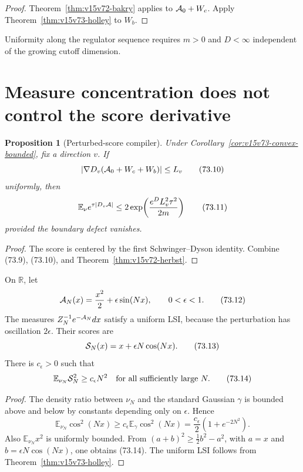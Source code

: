 \documentclass[11pt]{article}
\newtheorem{proposition}[theorem]{Proposition}
\theoremstyle{remark}
\begin{document}
\begin{proof}
Theorem~\ref{thm:v15v72-bakry} applies to
\({\cal A}_0+W_c\).  Apply
Theorem~\ref{thm:v15v73-holley} to \(W_b\).
\end{proof}

Uniformity along the regulator sequence requires \(m>0\) and
\(D<\infty\) independent of the growing cutoff dimension.

\section{Measure concentration does not control the score derivative}

\begin{proposition}[Perturbed-score compiler]
\label{prop:v15v73-score}
Under Corollary~\ref{cor:v15v73-convex-bounded}, fix a direction
\(v\).  If
\[
 \left|
 \nabla D_v({\cal A}_0+W_c+W_b)
 \right|\leq L_v                                      \tag{73.10}
\]
uniformly, then
\[
 \mathbb E_\nu e^{\tau|D_v{\cal A}|}
 \leq
 2\exp\!\left(
 \frac{e^DL_v^2\tau^2}{2m}
 \right)                                              \tag{73.11}
\]
provided the boundary defect vanishes.
\end{proposition}

\begin{proof}
The score is centered by the first Schwinger--Dyson identity.
Combine (73.9), (73.10), and
Theorem~\ref{thm:v15v72-herbst}.
\end{proof}

\begin{counterexample}
\label{cnt:v15v73-oscillation}
On \(\mathbb R\), let
\[
 {\cal A}_N(x)=\frac{x^2}{2}+\epsilon\sin(Nx),
 \qquad0<\epsilon<1.                                  \tag{73.12}
\]
The measures \(Z_N^{-1}e^{-{\cal A}_N}dx\) satisfy a uniform LSI,
because the perturbation has oscillation \(2\epsilon\).  Their
scores are
\[
 {\cal S}_N(x)=x+\epsilon N\cos(Nx).                  \tag{73.13}
\]
There is \(c_\epsilon>0\) such that
\[
 \mathbb E_{\nu_N}{\cal S}_N^2\geq c_\epsilon N^2
 \quad\hbox{for all sufficiently large }N.            \tag{73.14}
\]
\end{counterexample}

\begin{proof}
The density ratio between \(\nu_N\) and the standard Gaussian
\(\gamma\) is bounded above and below by constants depending only
on \(\epsilon\).  Hence
\[
 \mathbb E_{\nu_N}\cos^2(Nx)
 \geq c_\epsilon\mathbb E_\gamma\cos^2(Nx)
 =
 \frac{c_\epsilon}{2}(1+e^{-2N^2}).                   \tag{73.15}
\]
Also \(\mathbb E_{\nu_N}x^2\) is uniformly bounded.  From
\((a+b)^2\geq\tfrac12b^2-a^2\), with
\(a=x\) and \(b=\epsilon N\cos(Nx)\), one obtains (73.14).
The uniform LSI follows from
Theorem~\ref{thm:v15v73-holley}.
\end{proof}
\end{document}

